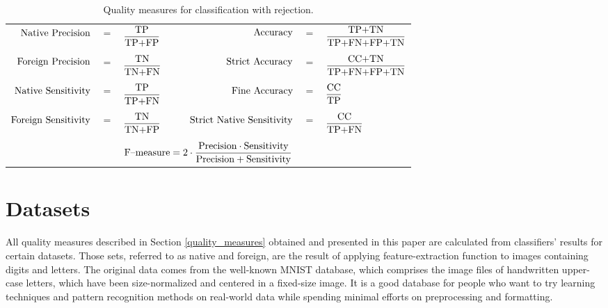 \begin{table}[!h]
	\centering
	\caption{Quality measures for classification with rejection.}
	\vspace{6pt}	
	{\footnotesize
		\begin{tabular}{rclrcl}
			$\textnormal{Native Precision}$ &$=$& $\displaystyle\frac{\textnormal{TP}}{\textnormal{TP+FP}}$ & 
			$\textnormal{Accuracy}$ &$=$& $\displaystyle\frac{\textnormal{TP+TN}}{\textnormal{TP+FN+FP+TN}}$ \\
			&&&&&\vspace{-3pt}\\
			$\textnormal{Foreign Precision}$ &$=$& $\displaystyle\frac{\textnormal{TN}}{\textnormal{TN+FN}}$ &
			$\textnormal{Strict Accuracy}$ &$=$& $\displaystyle\frac{\textnormal{CC+TN}}{\textnormal{TP+FN+FP+TN}}$ \\
			&&&&&\vspace{-3pt}\\
			$\textnormal{Native Sensitivity}$ &$=$& $\displaystyle\frac{\textnormal{TP}}{\textnormal{TP+FN}}$ &
			$\textnormal{Fine Accuracy}$ &$=$& $\displaystyle\frac{\textnormal{CC}}{\textnormal{TP}}$ \\
			&&&&&\vspace{-3pt}\\
			$\textnormal{Foreign Sensitivity}$ &$=$& $\displaystyle\frac{\textnormal{TN}}{\textnormal{TN+FP}}$ &
			$\hspace{18pt}\textnormal{Strict Native Sensitivity}$ &$=$& $\displaystyle\frac{\textnormal{CC}}{\textnormal{TP+FN}}$\\
			&&&&&\vspace{-3pt}\\
			\multicolumn{6}{c}{$\textnormal{F--measure}=2\cdot\displaystyle\frac{\textnormal{Precision}\cdot\textnormal{Sensitivity}}{\textnormal{Precision}+\textnormal{Sensitivity}}$}
		\end{tabular}
	}
	\label{tab:measures}
	\vspace{-12pt}
\end{table}

\section{Datasets} \label{datasets}

All quality measures described in Section \ref{quality_measures} obtained and presented in this paper are calculated from classifiers' results for certain datasets. Those sets, referred to as native and foreign, are the result of applying feature-extraction function to images containing digits and letters. The original data comes from the well-known MNIST database\cite{MNIST}, which comprises the image files of handwritten upper-case letters, which have been size-normalized and centered in a fixed-size image. It is a good database for people who want to try learning techniques and pattern recognition methods on real-world data while spending minimal efforts on preprocessing and formatting.

